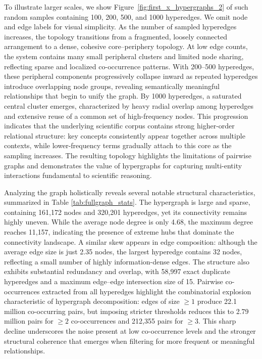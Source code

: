 \documentclass{article}
\begin{document}
To illustrate larger scales, we show Figure~\ref{fig:first_x_hypergraphs_2} of such random samples containing 100, 200, 500, and 1000 hyperedges. We omit node and edge labels for visual simplicity. As the number of sampled hyperedges increases, the topology transitions from a fragmented, loosely connected arrangement to a dense, cohesive core–periphery topology. At low edge counts, the system contains many small peripheral clusters and limited node sharing, reflecting sparse and localized co-occurrence patterns. With 200–500 hyperedges, these peripheral components progressively collapse inward as repeated hyperedges introduce overlapping node groups, revealing semantically meaningful relationships that begin to unify the graph. By 1000 hyperedges, a saturated central cluster emerges, characterized by heavy radial overlap among hyperedges and extensive reuse of a common set of high-frequency nodes. This progression indicates that the underlying scientific corpus contains strong higher-order relational structure: key concepts consistently appear together across multiple contexts, while lower-frequency terms gradually attach to this core as the sampling increases. The resulting topology highlights the limitations of pairwise graphs and demonstrates the value of hypergraphs for capturing multi-entity interactions fundamental to scientific reasoning.

Analyzing the graph holistically reveals several notable structural characteristics, summarized in Table \ref{tab:fullgraph_stats}. The hypergraph is large and sparse, containing 161{,}172 nodes and 320{,}201 hyperedges, yet its connectivity remains highly uneven. While the average node degree is only 4.68, the maximum degree reaches 11{,}157, indicating the presence of extreme hubs that dominate the connectivity landscape. A similar skew appears in edge composition: although the average edge size is just 2.35 nodes, the largest hyperedge contains 32 nodes, reflecting a small number of highly information-dense edges. The structure also exhibits substantial redundancy and overlap, with 58{,}997 exact duplicate hyperedges and a maximum edge–edge intersection size of 15. Pairwise co-occurrences extracted from all hyperedges highlight the combinatorial explosion characteristic of hypergraph decomposition: edges of size $\ge 1$ produce 22.1 million co-occurring pairs, but imposing stricter thresholds reduces this to 2.79 million pairs for $\ge 2$ co-occurrences and 212{,}355 pairs for $\ge 3$. This sharp decline underscores the noise present at low co-occurrence levels and the stronger structural coherence that emerges when filtering for more frequent or meaningful relationships.
\end{document}
